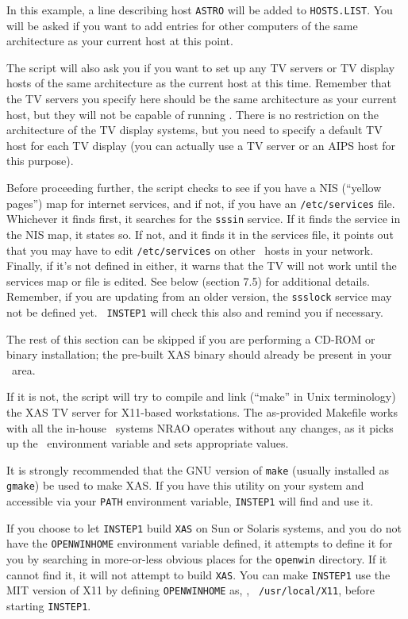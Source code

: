 \noindent In this example, a line describing host {\tt ASTRO} will be
added to {\tt HOSTS.LIST}.  You will be asked if you want to add entries
for other computers of the same architecture as your current host at
this point.

The script will also ask you if you want to set up any TV servers or TV
display hosts of the same architecture as the current host at this time.
Remember that the TV servers you specify here should be the same
architecture as your current host, but they will not be capable of
running \AIPS.  There is no restriction on the architecture of the TV
display systems, but you need to specify a default TV host for each TV
display (you can actually use a TV server or an AIPS host for this
purpose).

\medskip{}

Before proceeding further, the script checks to see if you have a NIS
(``yellow pages'') map for internet services, and if not, if you have an
{\tt /etc/services} file.  Whichever it finds first, it searches for the
{\tt sssin} service.  If it finds the service in the NIS map, it states
so.  If not, and it finds it in the services file, it points out that
you may have to edit {\tt /etc/services} on other \AIPS\ hosts in your
network.  Finally, if it's not defined in either, it warns that the TV
will not work until the services map or file is edited.  See below
(section 7.5)
for additional details.  Remember, if you are updating from an older
version, the {\tt ssslock} service may not be defined yet.  {\tt
INSTEP1} will check this also and remind you if necessary.

The rest of this section can be skipped if you are performing a CD-ROM
or binary installation; the pre-built XAS binary should already be
present in your \LOAD\ area.

If it is not, the script will try to compile and link (``make'' in Unix
terminology) the XAS TV server for X11-based workstations.  The
as-provided Makefile works with all the in-house \AIPS\ systems NRAO
operates without any changes, as it picks up the \ARCH\ environment
variable and sets appropriate values.

It is strongly recommended that the GNU version of {\tt make} (usually
installed as {\tt gmake}) be used to make XAS.  If you have this utility
on your system and accessible via your {\tt PATH} environment variable,
{\tt INSTEP1} will find and use it.

If you choose to let {\tt INSTEP1} build {\tt XAS} on Sun or Solaris
systems, and you do not have the {\tt OPENWINHOME} environment variable
defined, it attempts to define it for you by searching in more-or-less
obvious places for the {\tt openwin} directory.  If it cannot find it,
it will not attempt to build {\tt XAS}.  You can make {\tt INSTEP1} use
the MIT version of X11 by defining {\tt OPENWINHOME} as, \eg, {\tt
/usr/local/X11}, before starting {\tt INSTEP1}.

